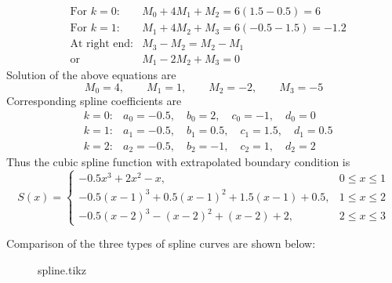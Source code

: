 \documentclass[12pt,class=book,crop=false]{standalone}
\begin{document}
\begin{soln}
\begin{enumerate}[label=(\alph*)]
\begin{align*}
			&\text{For }k = 0:		&M_0+4M_1+M_2=6(1.5-0.5)=6\\
			&\text{For }k = 1:		&M_1+4M_2+M_3=6(-0.5-1.5)=-1.2\\
			&\text{At right end:}		&M_3-M_2=M_2-M_1\\
			&\text{or}			&M_1-2M_2+M_3=0
		\end{align*}
		Solution of the above equations are
		\[
			M_0=4,\qquad    M_1=1,\qquad    M_2=-2,\qquad    M_3=-5
		\]
		Corresponding spline coefficients are
		\begin{align*}
			&k=0:		&a_0=-0.5,\quad  b_0=2,\quad  c_0=-1,\quad  d_0=0\\
			&k=1:		&a_1=-0.5,\quad  b_1=0.5,\quad  c_1=1.5,\quad  d_1=0.5\\
			&k=2:		&a_2=-0.5,\quad  b_2=-1,\quad  c_2=1,\quad  d_2=2
		\end{align*}
		Thus the cubic spline function with extrapolated boundary condition is
		\[
			S(x)=\begin{cases}
				-0.5x^3+2x^2-x, &0 \leq x \leq 1\\
				-0.5(x-1)^3+0.5(x-1)^2+1.5(x-1)+0.5,& 1 \leq x \leq 2\\
				-0.5(x-2)^3-(x-2)^2+(x-2)+2, &2 \leq x \leq 3
			\end{cases}
		\]
	\end{enumerate}
	\end{soln}
	Comparison of the three types of spline curves are shown below:
	\begin{figure}[H]
		\centering
		{spline.tikz}
	\end{figure}
\end{document}
